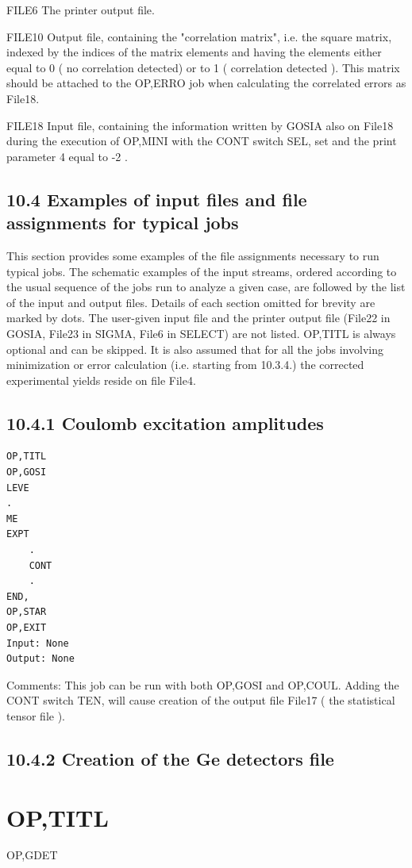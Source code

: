 \documentclass[10pt]{article}
\begin{document}
FILE6 The printer output file.

FILE10 Output file, containing the "correlation matrix", i.e. the square matrix, indexed by the indices of the matrix elements and having the elements either equal to 0 ( no correlation detected) or to 1 ( correlation detected ). This matrix should be attached to the OP,ERRO job when calculating the correlated errors as File18.

FILE18 Input file, containing the information written by GOSIA also on File18 during the execution of OP,MINI with the CONT switch SEL, set and the print parameter 4 equal to -2 .

\subsection*{10.4 Examples of input files and file assignments for typical jobs}
This section provides some examples of the file assignments necessary to run typical jobs. The schematic examples of the input streams, ordered according to the usual sequence of the jobs run to analyze a given case, are followed by the list of the input and output files. Details of each section omitted for brevity are marked by dots. The user-given input file and the printer output file (File22 in GOSIA, File23 in SIGMA, File6 in SELECT) are not listed. OP,TITL is always optional and can be skipped. It is also assumed that for all the jobs involving minimization or error calculation (i.e. starting from 10.3.4.) the corrected experimental yields reside on file File4.

\subsection*{10.4.1 Coulomb excitation amplitudes}
\begin{verbatim}
OP,TITL
OP,GOSI
LEVE
.
ME
EXPT
    .
    CONT
    .
END,
OP,STAR
OP,EXIT
Input: None
Output: None
\end{verbatim}

Comments: This job can be run with both OP,GOSI and OP,COUL. Adding the CONT switch TEN, will cause creation of the output file File17 ( the statistical tensor file ).

\subsection*{10.4.2 Creation of the Ge detectors file}
\section*{OP,TITL}
OP,GDET
\end{document}
